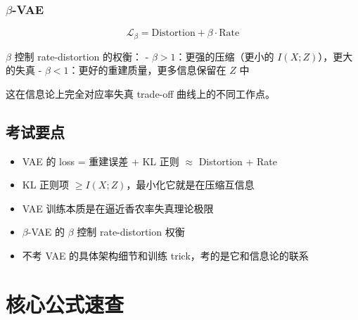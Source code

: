 \documentclass[12pt,a4paper]{ctexart}
\theoremstyle{definition}
\begin{document}
\subsubsection{$\beta$-VAE}

\[
\mathcal{L}_\beta = \text{Distortion} + \beta \cdot \text{Rate}
\]

$\beta$ 控制 rate-distortion 的权衡：
- $\beta > 1$：更强的压缩（更小的 $I(X;Z)$），更大的失真
- $\beta < 1$：更好的重建质量，更多信息保留在 $Z$ 中

这在信息论上完全对应率失真 trade-off 曲线上的不同工作点。

\subsection{考试要点}

\begin{itemize}[nosep]
  \item VAE 的 loss = 重建误差 + KL 正则 $\approx$ Distortion + Rate
  \item KL 正则项 $\geq I(X;Z)$，最小化它就是在压缩互信息
  \item VAE 训练本质是在逼近香农率失真理论极限
  \item $\beta$-VAE 的 $\beta$ 控制 rate-distortion 权衡
  \item 不考 VAE 的具体架构细节和训练 trick，考的是它和信息论的联系
\end{itemize}

\section{核心公式速查}
\end{document}
